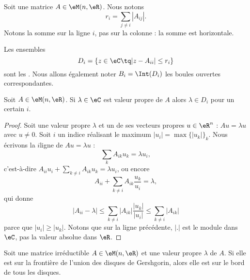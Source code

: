 Soit une matrice \( A\in\eM(n,\eR)\). Nous notons
\begin{equation}
	r_i=\sum_{j\neq i}| A_{ij} |.
\end{equation}
Notons la somme sur la ligne \( i\), pas sur la colonne : la somme est horizontale.
\begin{definition}
	Les ensembles
	\begin{equation}
		D_i=\{ z\in \eC\tq | z-A_{ii} |\leq r_i \}
	\end{equation}
	sont les . Nous allons également noter \( B_i=\Int(D_i)\) les boules ouvertes correspondantes.
\end{definition}

\begin{theorem}[Gershgorin]     \label{THOooUJNFooHpvCCF}
	Soit \( A\in \eM(n,\eR)\). Si \( \lambda\in \eC\) est valeur propre de \( A\) alors \(   \lambda\in D_i   \) pour un certain \( i\).
\end{theorem}

\begin{proof}
	Soit une valeur propre \( \lambda\) et un de ses vecteurs propres \( u\in \eR^n\) : \( Au=\lambda u\) avec \( u\neq 0\). Soit \( i\) un indice réalisant le maximum \( | u_i |=\max\{ | u_k | \}_k\). Nous écrivons la \( i\)\ieme ligne de \( Au=\lambda u\) :
	\begin{equation}
		\sum_kA_{ik}u_k=\lambda u_i,
	\end{equation}
	c'est-à-dire \( A_{ii}u_i+\sum_{k\neq i}A_{ik}u_k=\lambda u_i\), ou encore
	\begin{equation}
		A_{ii}+\sum_{k\neq i}A_{ik}\frac{ u_k }{ u_i }=\lambda,
	\end{equation}
	qui donne
	\begin{equation}
		| A_{ii} -\lambda|\leq \sum_{k\neq i}| A_{ik} |\frac{ | u_k | }{ | u_i | }\leq \sum_{k\neq i}| A_{ik} |
	\end{equation}
	parce que \( | u_i |\geq | u_k |\). Notons que sur la ligne précédente, \( | . |\) est le module dans \( \eC\), pas la valeur absolue dans \( \eR\).
\end{proof}

\begin{theorem}      \label{THOooTXAPooQqsBCj}
	Soit une matrice irréductible \( A\in \eM(n,\eR)\) et une valeur propre \( \lambda\) de \( A\). Si elle est sur la frontière de l'union des disques de Gershgorin, alors elle est sur le bord de tous les disques.
\end{theorem}

